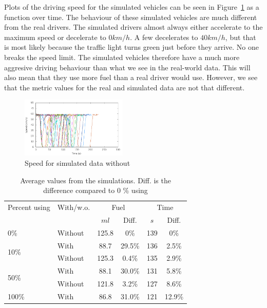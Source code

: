 Plots of the driving speed for the simulated vehicles can be seen in Figure~\ref{fig:TestResults:speed0} as a function over time.
The behaviour of these simulated vehicles are much different from the real drivers.
The simulated drivers almost always either accelerate to the maximum speed or decelerate to $0 km/h$. 
A few decelerates to $40 km/h$, but that is most likely because the traffic light turns green just before they arrive.
No one breaks the speed limit.
The simulated vehicles therefore have a much more aggresive driving behaviour than what we see in the real-world data.
This will also mean that they use more fuel than a real driver would use. %
However, we see that the metric values for the real and simulated data are not that different.

\begin{figure}[htb]
\includegraphics[width=0.45\textwidth]{../images/tp0c0_8/speedUncontrolled0.png}
\caption{Speed for simulated data without \tech}
\label{fig:TestResults:speed0}
\end{figure}

\begin{table}
\centering
\begin{tabular}{|l|l|cc|cc|}\hline
Percent using 			& With/w.o. & \multicolumn{2}{c|}{Fuel} 	& \multicolumn{2}{c|}{Time}\\
\tech					&\tech		& $ml$		& Diff.			&	$s$	& Diff.\\\hline
\multirow{1}{*}{0\%}	& Without	&	125.8	&	0\%			&	139 & 0\%		\\\hline
\multirow{2}{*}{10\%}	& With 		&	88.7	&	29.5\%		&	136 & 2.5\%		\\
						& Without 	&	125.3	&	0.4\%		&	135 & 2.9\%		\\\hline
\multirow{2}{*}{50\%}	& With		&	88.1	&	30.0\%		&	131 & 5.8\%		\\
						& Without	&	121.8	&	3.2\%		&	127 & 8.6\%		\\\hline
\multirow{1}{*}{100\%}	& With		&	86.8	&	31.0\%		&	121 & 12.9\%	\\\hline
\end{tabular}
\caption{Average values from the simulations. Diff. is the difference compared to 0 \% using \tech}
\label{tb:TestResults:total}
\end{table}

